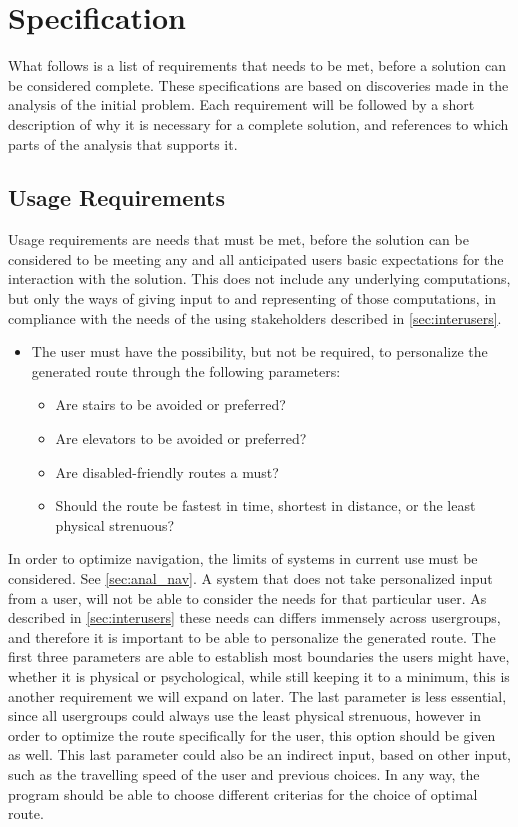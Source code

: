 \section{Specification} %
\label{sec:specification}

What follows is a list of requirements that needs to be met, before a solution can be considered complete. These specifications are based on discoveries made in the analysis of the initial problem. Each requirement will be followed by a short description of why it is necessary for a complete solution, and references to which parts of the analysis that supports it.

\subsection{Usage Requirements}

Usage requirements are needs that must be met, before the solution can be considered to be meeting any and all anticipated users basic expectations for the interaction with the solution. This does not include any underlying computations, but only the ways of giving input to and representing of those computations, in compliance with the needs of the using stakeholders described in \cref{sec:interusers}.

\begin{itemize}
	\item The user must have the possibility, but not be required, to personalize the generated route through the following parameters:
			\begin{itemize}
				\item Are stairs to be avoided or preferred?
				\item Are elevators to be avoided or preferred?
				\item Are disabled-friendly routes a must?
				\item Should the route be fastest in time, shortest in distance, or the least physical strenuous?
			\end{itemize}
\end{itemize}
In order to optimize navigation, the limits of systems in current use must be considered. See \cref{sec:anal_nav}. A system that does not take personalized input from a user, will not be able to consider the needs for that particular user. As described in \cref{sec:interusers} these needs can differs immensely across usergroups, and therefore it is important to be able to personalize the generated route.
The first three parameters are able to establish most boundaries the users might have, whether it is physical or psychological, while still keeping it to a minimum, this is another requirement we will expand on later. The last parameter is less essential, since all usergroups could always use the least physical strenuous, however in order to optimize the route specifically for the user, this option should be given as well. This last parameter could also be an indirect input, based on other input, such as the travelling speed of the user and previous choices. In any way, the program should be able to choose different criterias for the choice of optimal route.

